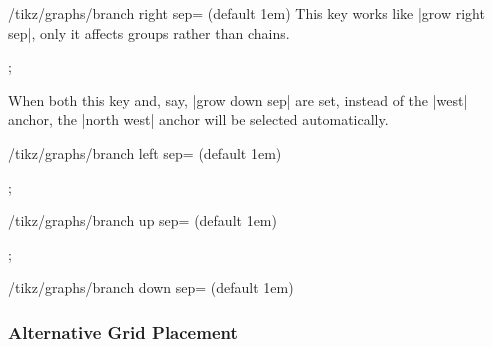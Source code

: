 \begin{key}{/tikz/graphs/branch right sep= (default 1em)}
  This key works like |grow right sep|, only it affects groups rather
  than chains.
\begin{codeexample}[]
\tikz {};      
\end{codeexample}
  When both this key and, say, |grow down sep| are set, instead of the
  |west| anchor, the |north west| anchor will be selected
  automatically. 
\end{key}

\begin{key}{/tikz/graphs/branch left sep= (default 1em)}
\begin{codeexample}[]
\tikz {};      
\end{codeexample}
\end{key}

\begin{key}{/tikz/graphs/branch up sep= (default 1em)}
\begin{codeexample}[]
\tikz {};      
\end{codeexample}
\end{key}


\begin{key}{/tikz/graphs/branch down sep= (default 1em)}
\end{key}


\subsubsection{Alternative Grid Placement}

